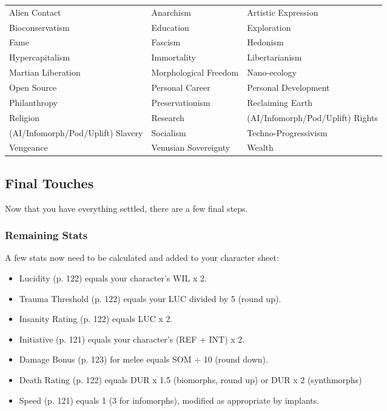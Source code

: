 \begin{tabular}{lll} Alien Contact &Anarchism &Artistic Expression \\ Bioconservatism &Education &Exploration \\ Fame &Fascism &Hedonism \\ Hypercapitalism &Immortality &Libertarianism \\ Martian Liberation &Morphological Freedom &Nano-ecology \\ Open Source &Personal Career &Personal Development \\ Philanthropy &Preservationism &Reclaiming Earth \\ Religion &Research &(AI/Infomorph/Pod/Uplift) Rights \\ (AI/Infomorph/Pod/Uplift) Slavery &Socialism &Techno-Progressivism \\ Vengeance &Venusian Sovereignty &Wealth \\ \end{tabular} 

\subsection{Final Touches} \label{sec:final-touches} 

Now that you have everything settled, there are a few final steps. 

\subsubsection{Remaining Stats} \label{sec:remaining-stats} 

A few stats now need to be calculated and added to your character sheet: 

\begin{itemize} \item Lucidity (p. 122) equals your character’s WIL x 2. \item Trauma Threshold (p. 122) equals your LUC divided by 5 (round up). \item Insanity Rating (p. 122) equals LUC x 2. \item Initiative (p. 121) equals your character’s (REF + INT) x 2. \item Damage Bonus (p. 123) for melee equals SOM $\div$ 10 (round down). \item Death Rating (p. 122) equals DUR x 1.5 (biomorphs, round up) or DUR x 2 (synthmorphs) \item Speed (p. 121) equals 1 (3 for infomorphs), modified as appropriate by implants. \end{itemize} 

